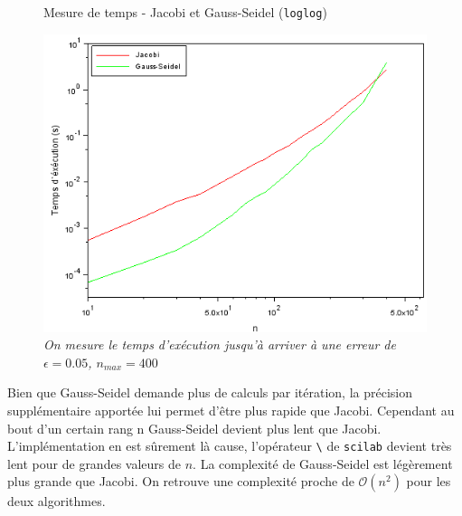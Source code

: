 \documentclass{article}
\begin{document}
\begin{figure}[H]
\caption{Mesure de temps - Jacobi et Gauss-Seidel (\texttt{loglog})}
\centering
\includegraphics[scale=0.70]{time_jac_seid_loglog}
\caption*{\textit{On mesure le temps d'exécution jusqu'à arriver à une erreur de $\epsilon = 0.05$, $n_{max} = 400$}}
\end{figure}
Bien que Gauss-Seidel demande plus de calculs par itération, la précision supplémentaire apportée lui permet d'être plus rapide que Jacobi. Cependant au bout d'un certain rang n Gauss-Seidel devient plus lent que Jacobi. L'implémentation en est sûrement là cause, l'opérateur \texttt{\textbackslash} de \texttt{scilab} devient très lent pour de grandes valeurs de $n$. La complexité de Gauss-Seidel est légèrement plus grande que Jacobi. On retrouve une complexité proche de \(\mathcal{O}(n^2)\) pour les deux algorithmes. 
\end{document}
